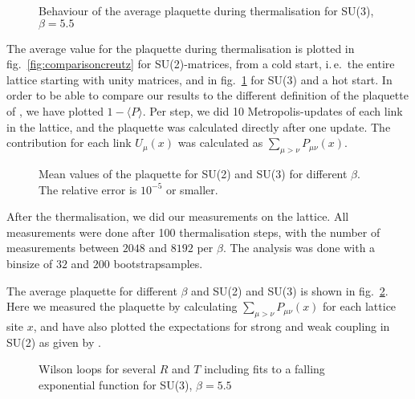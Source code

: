 \documentclass[%
 reprint,
 amsmath,amssymb,
 aps,
]{revtex4-1}
\begin{document}
\begin{figure}
	\centering
	
	\caption[Behaviour of the plaquette for SU(3)]{Behaviour of the average plaquette during thermalisation for SU(3), $\beta=5.5$}
	\label{fig:plaquettethermsu3}
\end{figure} 

The average value for the plaquette during thermalisation is plotted in fig.~\ref{fig:comparisoncreutz} for SU(2)-matrices, from a cold start, i.\,e.\, the entire lattice starting with unity matrices, and in fig.~\ref{fig:plaquettethermsu3} for SU(3) and a hot start. In order to be able to compare our results to the different definition of the plaquette of \citet{creutzsu2}, we have plotted $1-\langle P\rangle$. Per step, we did 10 Metropolis-updates of each link in the lattice, and the plaquette was calculated directly after one update. The contribution for each link $U_\mu(x)$ was calculated as $\sum_{\mu>\nu}P_{\mu\nu}(x)$.




\begin{figure}
	\centering
	
	\caption[Mean values of the plaquette]{Mean values of the plaquette for SU(2) and SU(3) for different $\beta$. The relative error is $10^{-5}$ or smaller.}
	\label{fig:plaquettetotal}
\end{figure}

After the thermalisation, we did our measurements on the lattice. All measurements were done after 100 thermalisation steps, with the number of measurements between $2048$ and $8192$ per $\beta$. The analysis was done with a binsize of $32$ and $200$ bootstrapsamples. 

The average plaquette for different $\beta$ and SU(2) and SU(3) is shown in fig.~\ref{fig:plaquettetotal}. Here we measured the plaquette by calculating $\sum_{\mu>\nu}P_{\mu\nu}(x)$ for each lattice site $x$, and have also plotted the expectations for strong and weak coupling in SU(2) as given by \citet{creutzsu2}.

\begin{figure}
	\centering
	
	\caption[Different Wilson loops for SU(3), $\beta=5.5$]{Wilson loops for several $R$ and $T$ including fits to a falling exponential function for SU(3), $\beta=5.5$}
	\label{fig:wilsonloopbeta5.5su3}
\end{figure} 
\end{document}
